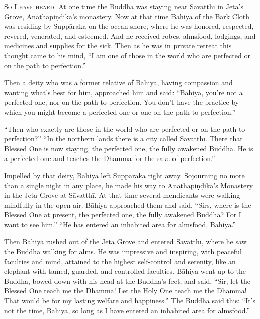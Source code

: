 \documentclass[12pt,openany]{book}%
\newcommand*{\scevam}[1]{\textsc{#1}}
\begin{document}
\scevam{So I have heard. }At one time the Buddha was staying near \textsanskrit{Sāvatthī} in Jeta’s Grove, \textsanskrit{Anāthapiṇḍika}’s monastery. Now at that time \textsanskrit{Bāhiya} of the Bark Cloth was residing by \textsanskrit{Suppāraka} on the ocean shore, where he was honored, respected, revered, venerated, and esteemed. And he received robes, almsfood, lodgings, and medicines and supplies for the sick. Then as he was in private retreat this thought came to his mind, “I am one of those in the world who are perfected or on the path to perfection.” 

Then a deity who was a former relative of \textsanskrit{Bāhiya}, having compassion and wanting what’s best for him, approached him and said: “\textsanskrit{Bāhiya}, you’re not a perfected one, nor on the path to perfection. You don’t have the practice by which you might become a perfected one or one on the path to perfection.” 

“Then who exactly are those in the world who are perfected or on the path to perfection?” “In the northern lands there is a city called \textsanskrit{Sāvatthī}. There that Blessed One is now staying, the perfected one, the fully awakened Buddha. He is a perfected one and teaches the Dhamma for the sake of perfection.” 

Impelled by that deity, \textsanskrit{Bāhiya} left \textsanskrit{Suppāraka} right away. Sojourning no more than a single night in any place, he made his way to \textsanskrit{Anāthapiṇḍika}’s Monastery in the Jeta Grove at \textsanskrit{Sāvatthī}. At that time several mendicants were walking mindfully in the open air. \textsanskrit{Bāhiya} approached them and said, “Sirs, where is the Blessed One at present, the perfected one, the fully awakened Buddha? For I want to see him.” “He has entered an inhabited area for almsfood, \textsanskrit{Bāhiya}.” 

Then \textsanskrit{Bāhiya} rushed out of the Jeta Grove and entered \textsanskrit{Sāvatthī}, where he saw the Buddha walking for alms. He was impressive and inspiring, with peaceful faculties and mind, attained to the highest self-control and serenity, like an elephant with tamed, guarded, and controlled faculties. \textsanskrit{Bāhiya} went up to the Buddha, bowed down with his head at the Buddha’s feet, and said, “Sir, let the Blessed One teach me the Dhamma! Let the Holy One teach me the Dhamma! That would be for my lasting welfare and happiness.” The Buddha said this: “It’s not the time, \textsanskrit{Bāhiya}, so long as I have entered an inhabited area for almsfood.” 
\end{document}
